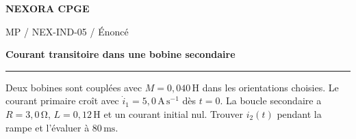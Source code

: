 \documentclass[11pt,a4paper]{article}
\begin{document}
{\small\bfseries\color{nexorablue} NEXORA CPGE}\par
{\small MP / NEX-IND-05 / Énoncé}\par
{\LARGE\bfseries Courant transitoire dans une bobine secondaire}\par
\vspace{0.25em}\hrule\vspace{0.6em}

Deux bobines sont couplées avec $M=0{,}040\,\mathrm H$ dans les orientations choisies. Le courant primaire croît avec $\dot i_1=5{,}0\,\mathrm{A\,s^{-1}}$ dès $t=0$. La boucle secondaire a $R=3{,}0\,\mathrm\Omega$, $L=0{,}12\,\mathrm H$ et un courant initial nul. Trouver $i_2(t)$ pendant la rampe et l’évaluer à $80\,\mathrm{ms}$.
\end{document}
